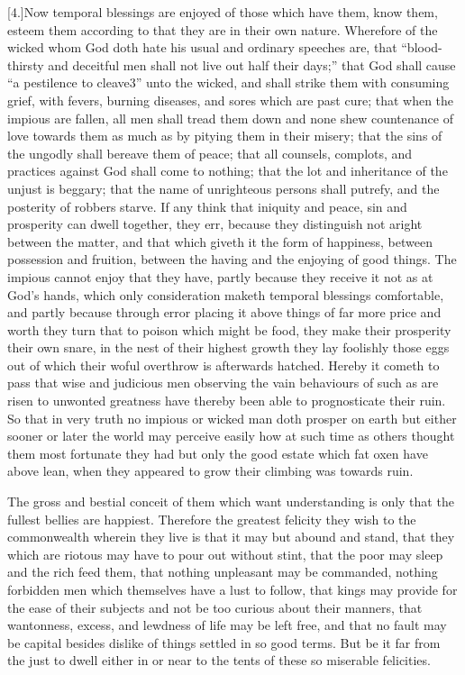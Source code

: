 [4.]Now temporal blessings are enjoyed of those which have them, know them, esteem them according to that they are in their own nature. Wherefore of the wicked whom God doth hate his usual and ordinary speeches are, that “blood-thirsty and deceitful men shall not live out half their days;” that God shall cause “a pestilence to cleave3” unto the wicked, and shall strike them with consuming grief, with fevers, burning diseases, and sores which are past cure; that when the impious are fallen, all men shall tread them down  and none shew countenance of love towards them as much as by pitying them in their misery; that the sins of the ungodly shall bereave them of peace; that all counsels, complots, and practices against God shall come to nothing; that the lot and inheritance of the unjust is beggary; that the name of unrighteous persons shall putrefy, and the posterity of robbers starve. If any think that iniquity and peace, sin and prosperity can dwell together, they err, because they distinguish not aright between the matter, and that which giveth it the form of happiness, between possession and fruition, between the having and the enjoying of good things. The impious cannot enjoy that they have, partly because they receive it not as at God’s hands, which only consideration maketh temporal blessings comfortable, and partly because through error placing it above things of far more price and worth they turn that to poison which might be food, they make their prosperity their own snare, in the nest of their highest growth they lay foolishly those eggs out of which their woful overthrow is afterwards hatched. Hereby it cometh to pass that wise and judicious men observing the vain behaviours of such as are risen to unwonted greatness have thereby been able to prognosticate their ruin. So that in very truth no impious or wicked man doth prosper on earth but either sooner or later the world may perceive easily how at such time as others thought them most fortunate they had but only the good estate which fat oxen have above lean, when they appeared to grow their climbing was towards ruin.

The gross and bestial conceit of them which want understanding is only that the fullest bellies are happiest. Therefore  the greatest felicity they wish to the commonwealth wherein they live is that it may but abound and stand,
 that they which are riotous may have to pour out without stint, that the poor may sleep and the rich feed them, that nothing unpleasant may be commanded, nothing forbidden men which themselves have a lust to follow, that kings may provide for the ease of their subjects and not be too curious about their manners, that wantonness, excess, and lewdness of life may be left free, and that no fault may be capital besides dislike of things settled in so good terms. But be it far from the just to dwell either in or near to the tents of these so miserable felicities.

